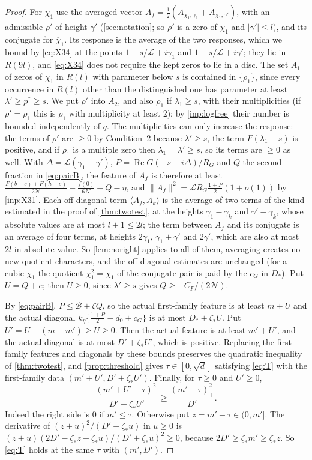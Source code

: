 \documentclass[11pt]{amsart}
\numberwithin{equation}{section}
\theoremstyle{plain}
\theoremstyle{definition}
\theoremstyle{remark}
\newcommand{\LL}{\mathcal{L}}
\renewcommand{\Re}{\operatorname{Re}}
\newcommand{\1}{\mathbf{1}}
\newcommand{\bchi}{\overline{\chi}}
\begin{document}
\begin{proof}
For $\chi_1$ use the averaged vector $A_f=\frac12(A_{\chi_1,\gamma_1}+A_{\chi_1,\gamma'})$, with an admissible $\rho'$ of height
$\gamma'$ (\cref{sec:notation}; so $\rho'$ is a zero of $\chi_1$ and $|\gamma'|\le l$), and its conjugate for $\bchi_1$. Its
response is the average of the two responses, which we bound by \eqref{eq:X34} at the points
$1-s/\LL+i\gamma_1$ and $1-s/\LL+i\gamma'$; they lie in $R(9l)$, and \eqref{eq:X34} does not require the kept zeros
to lie in a disc. The set $A_1$ of zeros of $\chi_1$ in $R(l)$ with parameter below $s$ is contained in
$\{\rho_1\}$, since every occurrence in $R(l)$ other than the distinguished one has parameter at least
$\lambda'\ge p^*\ge s$. We put $\rho'$ into $A_2$, and also $\rho_1$ if $\lambda_1\ge s$, with their multiplicities (if
$\rho'=\rho_1$ this is $\rho_1$ with multiplicity at least $2$); by \cref{inp:logfree} their number is bounded
independently of $q$. The multiplicities can only increase the response: the terms of $\rho'$ are
$\ge0$ by Condition~2 because $\lambda'\ge s$, the term $F(\lambda_1-s)$ is positive, and if $\rho_1$ is a multiple
zero then $\lambda_1=\lambda'\ge s$, so its terms are $\ge0$ as well. With $\Delta=\LL(\gamma_1-\gamma')$, $P=\Re G(-s+i\Delta)/R_G$ and $Q$ the second
fraction in \eqref{eq:pairB}, the feature of $A_f$ is therefore at least
$\frac{F(b-s)+F(h-s)}{2\mathcal N}-\frac{f(0)}{6\mathcal N}+Q-\eta$, and $\|A_f\|^2=\LL R_G\frac{1+P}2(1+o(1))$ by \cref{inp:X31}. Each
off-diagonal term $\langle A_f,A_k\rangle$ is the average of two terms of the kind estimated in the proof of
\cref{thm:twotest}, at the heights $\gamma_1-\gamma_k$ and $\gamma'-\gamma_k$, whose absolute values are at most
$l+1\le2l$; the term between $A_f$ and its conjugate is an average of four terms, at heights
$2\gamma_1$, $\gamma_1+\gamma'$ and $2\gamma'$, which are also at most $2l$ in absolute value. So \cref{lem:noright}
applies to all of them, averaging creates no new quotient characters, and the off-diagonal estimates
are unchanged (for a cubic $\chi_1$ the quotient $\chi_1^2=\bchi_1$ of the conjugate pair is paid by the $c_G$
in $D_*$). Put $U=Q+e$; then $U\ge0$, since $\lambda'\ge s$ gives
$Q\ge-C_F/(2\mathcal N)$.

By \eqref{eq:pairB}, $P\le\mathcal B+\zeta Q$, so the actual first-family feature is at least $m+U$ and the
actual diagonal $k_\eta\{\frac{1+P}2-d_0+c_G\}$ is at most $D_*+\zeta_*U$. Put $U'=U+(m-m')\ge U\ge0$. Then the actual
feature is at least $m'+U'$, and the actual diagonal is at most $D'+\zeta_*U'$, which is positive.
Replacing the first-family features and diagonals by these bounds preserves the quadratic
inequality of \cref{thm:twotest}, and \cref{prop:threshold} gives $\tau\in[0,\sqrt d]$ satisfying \eqref{eq:T}
with the first-family data $(m'+U',D'+\zeta_*U')$. Finally, for $\tau\ge0$ and $U'\ge0$,
\[
  \frac{(m'+U'-\tau)_+^2}{D'+\zeta_*U'}\ge\frac{(m'-\tau)_+^2}{D'} .
\]
Indeed the right side is $0$ if $m'\le\tau$. Otherwise put $z=m'-\tau\in(0,m']$. The derivative of
$(z+u)^2/(D'+\zeta_*u)$ in $u\ge0$ is $(z+u)(2D'-\zeta_*z+\zeta_*u)/(D'+\zeta_*u)^2\ge0$, because
$2D'\ge\zeta_*m'\ge\zeta_*z$. So \eqref{eq:T} holds at the same $\tau$ with $(m',D')$.
\end{proof}
\end{document}

